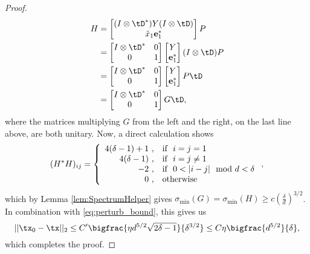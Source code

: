 \begin{proof}
\begin{align}
H & =   \begin{bmatrix} (I \otimes \tD^*) Y (I \otimes \tD) \\ \tilde{x}_1\mathbf{e}_1^* \end{bmatrix} P \nonumber\\
& =  \begin{bmatrix} I \otimes \tD^* & 0 \\ 0 & 1 \end{bmatrix} \begin{bmatrix} Y \\ \mathbf{e}_1^* \end{bmatrix} (I \otimes \tD) P \nonumber\\
& =  \begin{bmatrix} I \otimes \tD^* & 0 \\ 0 & 1 \end{bmatrix} \begin{bmatrix} Y \\ \mathbf{e}_1^* \end{bmatrix} P \tD \nonumber\\
& =  \begin{bmatrix} I \otimes \tD^* & 0 \\ 0 & 1 \end{bmatrix} G \tD,
\end{align}
where the matrices multiplying $G$ from the left and the right, on the last line above, are both unitary. Now, a direct calculation shows 
\begin{equation}\label{eq:H}
(H^* H)_{ij} = \left\{\begin{array}{r@{ \ , \quad}l}
4(\delta - 1) + 1 & \text{if } \ i = j = 1 \\
4(\delta - 1) & \text{if } \ i = j \neq 1 \\
-2 & \text{if } \ 0 < |i - j| \mod d < \delta \\
0 & \text{otherwise}
\end{array}\right. ,\end{equation} which by Lemma \ref{lem:SpectrumHelper} gives $\sigma_{\min}(G) = \sigma_{\min}(H)\geq c \left(\frac{\delta}{d}\right)^{3/2}$.
In combination with \eqref{eq:perturb_bound}, this gives us
\[ ||{\tx}_0 - {\tx}||_2 \leq C' \bigfrac{\eta d^{5/2}\sqrt{2 \delta - 1}}{\delta^{3/2}} \leq C\eta \bigfrac{ d^{5/2}}{\delta},\]
which completes the proof.
\end{proof}


